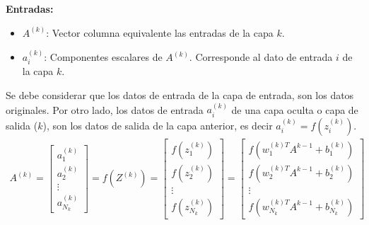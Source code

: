 \textbf{Entradas:}
\begin{itemize}
    \item $A^{(k)}$: Vector columna equivalente las entradas de la capa $k$.
    \item $a_{i}^{(k)}$: Componentes escalares de $A^{(k)}$. Corresponde al dato de entrada $i$ de la capa $k$.
\end{itemize}
%
Se debe considerar que los datos de entrada de la capa de entrada, son los datos originales. Por otro lado, los datos de entrada $a_{i}^{(k)}$ de una capa oculta o capa de salida ($k$), son los datos de salida de la capa anterior, es decir $a_{i}^{(k)} = f(z_{i}^{(k)})$.
%
\begin{align*}
    A^{(k)} = \begin{bmatrix} 
                a_{1}^{(k)} \\ 
                a_{2}^{(k)} \\ 
                \vdots \\ 
                a_{N_k}^{(k)} 
              \end{bmatrix}
            = f(Z^{(k)})
            = \begin{bmatrix} 
                f(z_{1}^{(k)}) \\ 
                f(z_{2}^{(k)}) \\ 
                \vdots \\ 
                f(z_{N_k}^{(k)}) 
              \end{bmatrix}
            = \begin{bmatrix} 
                f(w_{1}^{(k)T} A^{k-1} + b_1^{(k)}) \\ 
                f(w_{2}^{(k)T} A^{k-1} + b_2^{(k)}) \\ 
                \vdots \\ 
                f(w_{N_k}^{(k)T} A^{k-1} + b_{N_k}^{(k)}) 
              \end{bmatrix}
\end{align*}
%

